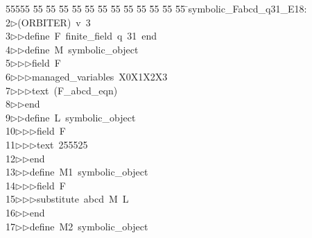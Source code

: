 %
%
\begin{tabbing}
55555 \= 55 \= 55 \= 55 \= 55 \= 55 \= 55 \= 55 \= 55 \= 55 \= 55 \= 55 \= 55 \= \>symbolic\_Fabcd\_q31\_E18:\\[0pt]
2\>$\triangleright$\>(ORBITER)\ v\ 3\ \\[0pt]
3\>$\triangleright$\>$\triangleright$\>define\ F\ finite\_field\ q\ 31\ end\ \\[0pt]
4\>$\triangleright$\>$\triangleright$\>define\ M\ symbolic\_object\ \\[0pt]
5\>$\triangleright$\>$\triangleright$\>$\triangleright$\>field\ F\ \\[0pt]
6\>$\triangleright$\>$\triangleright$\>$\triangleright$\>managed\_variables\ X0X1X2X3\ \\[0pt]
7\>$\triangleright$\>$\triangleright$\>$\triangleright$\>text\ (F\_abcd\_eqn)\ \\[0pt]
8\>$\triangleright$\>$\triangleright$\>end\ \\[0pt]
9\>$\triangleright$\>$\triangleright$\>define\ L\ symbolic\_object\ \\[0pt]
10\>$\triangleright$\>$\triangleright$\>$\triangleright$\>field\ F\ \\[0pt]
11\>$\triangleright$\>$\triangleright$\>$\triangleright$\>text\ 255525\ \\[0pt]
12\>$\triangleright$\>$\triangleright$\>end\ \\[0pt]
13\>$\triangleright$\>$\triangleright$\>define\ M1\ symbolic\_object\ \\[0pt]
14\>$\triangleright$\>$\triangleright$\>$\triangleright$\>field\ F\ \\[0pt]
15\>$\triangleright$\>$\triangleright$\>$\triangleright$\>substitute\ abcd\ M\ L\ \\[0pt]
16\>$\triangleright$\>$\triangleright$\>end\ \\[0pt]
17\>$\triangleright$\>$\triangleright$\>define\ M2\ symbolic\_object\ \\[0pt]

\end{tabbing}
